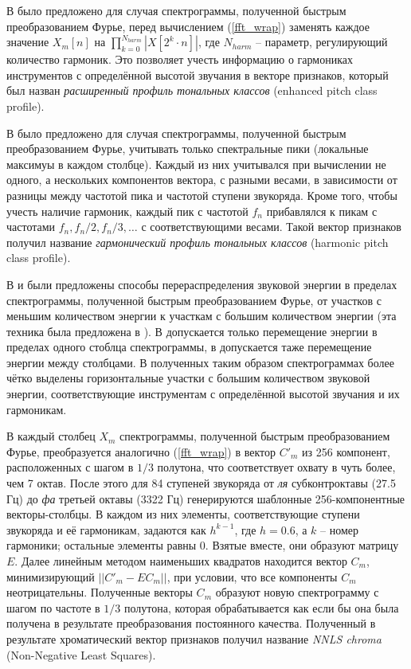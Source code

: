 В \cite{Lee2006} было предложено для случая спектрограммы, полученной быстрым
преобразованием Фурье, перед вычислением (\ref{fft_wrap}) заменять каждое
значение $X_m[n]$ на $\prod_{k=0}^{N_{harm}} |X[2^k \cdot n]|$, где $N_{harm}$
-- параметр, регулирующий количество гармоник. Это позволяет учесть информацию о
гармониках инструментов с определённой высотой звучания в векторе признаков,
который был назван \emph{расширенный профиль тональных классов} (enhanced pitch
class profile).

В \cite{Gomez2006} было предложено для случая спектрограммы, полученной быстрым
преобразованием Фурье, учитывать только спектральные пики (локальные максимуы в
каждом столбце). Каждый из них учитывался при вычислении не одного, а
нескольких компонентов вектора, с разными весами, в зависимости от разницы
между частотой пика и частотой ступени звукоряда. Кроме того, чтобы учесть
наличие гармоник, каждый пик с частотой $f_n$ прибавлялся к пикам с частотами
$f_n, f_n/2, f_n/3, \ldots$ с соответствующими весами. Такой вектор признаков
получил название \emph{гармонический профиль тональных классов} (harmonic
pitch class profile).

В \cite{Weller2009} и \cite{Khadkevich2011} были предложены способы
перераспределения звуковой энергии в пределах спектрограммы, полученной быстрым
преобразованием Фурье, от участков с меньшим количеством энергии к участкам с
большим количеством энергии (эта техника была предложена в \cite{Kodera1978}). В
\cite{Weller2009} допускается только перемещение энергии в пределах одного
стоблца спектрограммы, в \cite{Khadkevich2011} допускается таже перемещение
энергии между столбцами. В полученных таким образом спектрограммах более чётко
выделены горизонтальные участки с большим количеством звуковой энергии,
соответствующие инструментам с определённой высотой звучания и их гармоникам.

В \cite{Mauch2010} каждый столбец $X_m$ спектрограммы, полученной быстрым
преобразованием Фурье, преобразуется аналогично (\ref{fft_wrap}) в вектор $C'_m$
из 256 компонент, расположенных с шагом в $1/3$ полутона, что соответствует
охвату в чуть более, чем 7 октав. После этого для 84 ступеней звукоряда от
\emph{ля} субконтроктавы (27.5 Гц) до \emph{фа} третьей октавы (3322 Гц)
генерируются шаблонные 256-компонентные векторы-столбцы. В каждом из них
элементы, соответствующие ступени звукоряда и её гармоникам, задаются как
$h^{k-1}$, где $h=0.6$, а $k$ -- номер гармоники; остальные элементы равны 0.
Взятые вместе, они образуют матрицу $E$. Далее линейным методом наименьших
квадратов находится вектор $C_m$, минимизирующий $||C'_m - EC_m||$, при условии,
что все компоненты $C_m$ неотрицательны. Полученные векторы $C_m$ образуют новую
спектрограмму с шагом по частоте в $1/3$ полутона, которая обрабатывается как
если бы она была получена в результате преобразования постоянного качества.
Полученный в результате хроматический вектор признаков получил название
\emph{NNLS chroma} (Non-Negative Least Squares).

